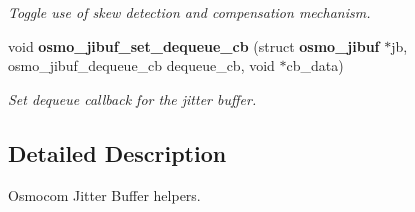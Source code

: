 \begin{DoxyCompactItemize}
\begin{DoxyCompactList}\small\item\em Toggle use of skew detection and compensation mechanism. \end{DoxyCompactList}\item 
void {\bf osmo\+\_\+jibuf\+\_\+set\+\_\+dequeue\+\_\+cb} (struct {\bf osmo\+\_\+jibuf} $\ast$jb, osmo\+\_\+jibuf\+\_\+dequeue\+\_\+cb dequeue\+\_\+cb, void $\ast$cb\+\_\+data)
\begin{DoxyCompactList}\small\item\em Set dequeue callback for the jitter buffer. \end{DoxyCompactList}\end{DoxyCompactItemize}


\subsection{Detailed Description}
Osmocom Jitter Buffer helpers. 

